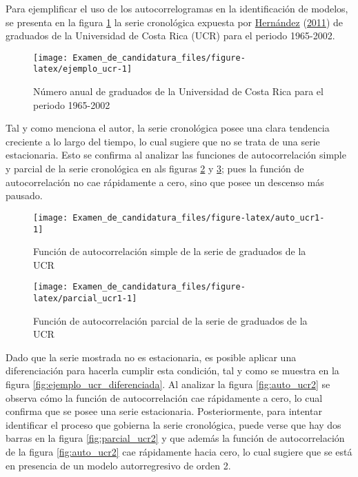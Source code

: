 \documentclass[
]{article}
\begin{document}
Para ejemplificar el uso de los autocorrelogramas en la identificación
de modelos, se presenta en la figura \ref{fig:ejemplo_ucr} la serie
cronológica expuesta por \protect\hyperlink{ref-oscarh-1}{Hernández}
(\protect\hyperlink{ref-oscarh-1}{2011}) de graduados de la Universidad
de Costa Rica (UCR) para el periodo 1965-2002.

\begin{figure}[H]
\texttt{[image: Examen\_de\_candidatura\_files/figure-latex/ejemplo\_ucr-1]} \caption{Número anual de graduados de la Universidad de Costa Rica para el periodo 1965-2002}\label{fig:ejemplo_ucr}
\end{figure}

Tal y como menciona el autor, la serie cronológica posee una clara
tendencia creciente a lo largo del tiempo, lo cual sugiere que no se
trata de una serie estacionaria. Esto se confirma al analizar las
funciones de autocorrelación simple y parcial de la serie cronológica en
als figuras \ref{fig:auto_ucr1} y \ref{fig:parcial_ucr1}; pues la
función de autocorrelación no cae rápidamente a cero, sino que posee un
descenso más pausado.

\begin{figure}[H]
\texttt{[image: Examen\_de\_candidatura\_files/figure-latex/auto\_ucr1-1]} \caption{Función de autocorrelación simple de la serie de graduados de la UCR}\label{fig:auto_ucr1}
\end{figure}

\begin{figure}[H]
\texttt{[image: Examen\_de\_candidatura\_files/figure-latex/parcial\_ucr1-1]} \caption{Función de autocorrelación parcial de la serie de graduados de la UCR}\label{fig:parcial_ucr1}
\end{figure}

Dado que la serie mostrada no es estacionaria, es posible aplicar una
diferenciación para hacerla cumplir esta condición, tal y como se
muestra en la figura \ref{fig:ejemplo_ucr_diferenciada}. Al analizar la
figura \ref{fig:auto_ucr2} se observa cómo la función de autocorrelación
cae rápidamente a cero, lo cual confirma que se posee una serie
estacionaria. Posteriormente, para intentar identificar el proceso que
gobierna la serie cronológica, puede verse que hay dos barras en la
figura \ref{fig:parcial_ucr2} y que además la función de autocorrelación
de la figura \ref{fig:auto_ucr2} cae rápidamente hacia cero, lo cual
sugiere que se está en presencia de un modelo autorregresivo de orden 2.
\end{document}

